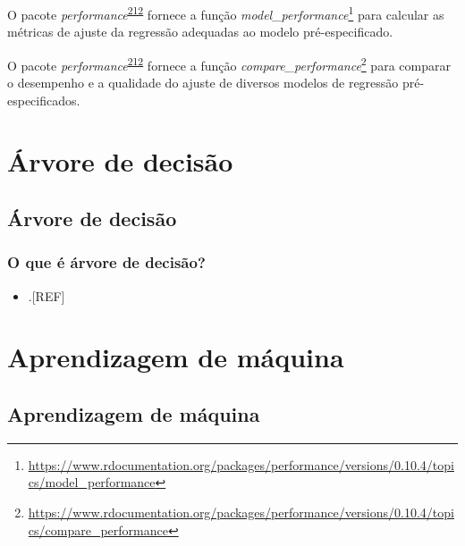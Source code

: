 \documentclass[
  a4paper,
]{book}
\providecommand{\tightlist}{%
  \setlength{\itemsep}{0pt}\setlength{\parskip}{0pt}}
\renewcommand{\href}[2]{#2\footnote{\url{#1}}}
\newenvironment{infobox}[1]
  {
  \begin{itemize}
  \renewcommand{\labelitemi}{
    \raisebox{-.7\height}[0pt][0pt]{
      {\setkeys{Gin}{width=3em,keepaspectratio}
        \texttt{[image: \#1]}}
    }
  }
  \setlength{\fboxsep}{1em}
  \begin{blackbox}
  \item
  }
  {
  \end{blackbox}
  \end{itemize}
  }
\begin{document}
\begin{infobox}{images/Rlogo}
O pacote \emph{performance}\textsuperscript{\protect\hyperlink{ref-performance}{212}} fornece a função \href{https://www.rdocumentation.org/packages/performance/versions/0.10.4/topics/model_performance}{\emph{model\_performance}} para calcular as métricas de ajuste da regressão adequadas ao modelo pré-especificado.

\end{infobox}

\begin{infobox}{images/Rlogo}
O pacote \emph{performance}\textsuperscript{\protect\hyperlink{ref-performance}{212}} fornece a função \href{https://www.rdocumentation.org/packages/performance/versions/0.10.4/topics/compare_performance}{\emph{compare\_performance}} para comparar o desempenho e a qualidade do ajuste de diversos modelos de regressão pré-especificados.

\end{infobox}

\hypertarget{arvore-decisao}{%
\chapter{\texorpdfstring{\textbf{Árvore de decisão}}{Árvore de decisão}}\label{arvore-decisao}}

\hypertarget{arvore-decisao}{%
\section{Árvore de decisão}\label{arvore-decisao}}

\hypertarget{o-que-uxe9-uxe1rvore-de-decisuxe3o}{%
\subsection{O que é árvore de decisão?}\label{o-que-uxe9-uxe1rvore-de-decisuxe3o}}

\begin{itemize}
\tightlist
\item
  .{[}REF{]}
\end{itemize}

\hypertarget{aprendizagem-maquina}{%
\chapter{\texorpdfstring{\textbf{Aprendizagem de máquina}}{Aprendizagem de máquina}}\label{aprendizagem-maquina}}

\hypertarget{aprendizagem-maquina}{%
\section{Aprendizagem de máquina}\label{aprendizagem-maquina}}
\end{document}
